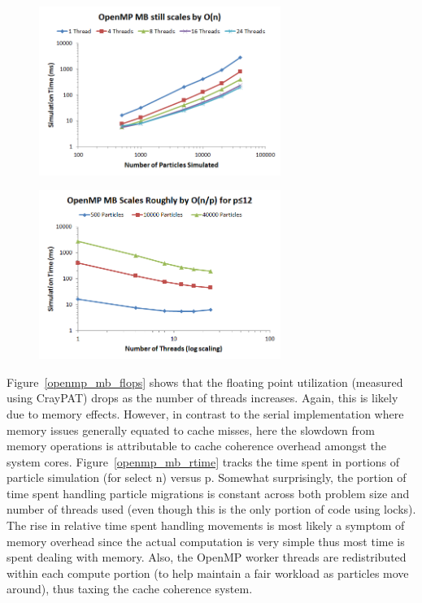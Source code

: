\documentclass[11pt]{article} %
\begin{document}
\begin{figure}[!h]
\centering
\includegraphics[width=0.7\textwidth]{figures/openmp_mb_n.png}
\caption{}
\label{openmp_mb_n}
\end{figure}

\begin{figure}[!h]
\centering
\includegraphics[width=0.7\textwidth]{figures/openmp_mb_p.png}
\caption{}
\label{openmp_mb_p}
\end{figure}

Figure~\ref{openmp_mb_flops} shows that the floating point utilization (measured using CrayPAT) drops as the number of threads increases. Again, this is likely due to memory effects. However, in contrast to the serial implementation where memory issues generally equated to cache misses, here the slowdown from memory operations is attributable to cache coherence overhead amongst the system cores. Figure~\ref{openmp_mb_rtime} tracks the time spent in portions of particle simulation (for select n) versus p. Somewhat surprisingly, the portion of time spent handling particle migrations is constant across both problem size and number of threads used (even though this is the only portion of code using locks). The rise in relative time spent handling movements is most likely a symptom of memory overhead since the actual computation is very simple thus most time is spent dealing with memory. Also, the OpenMP worker threads are redistributed within each compute portion (to help maintain a fair workload as particles move around), thus taxing the cache coherence system.
\end{document}
